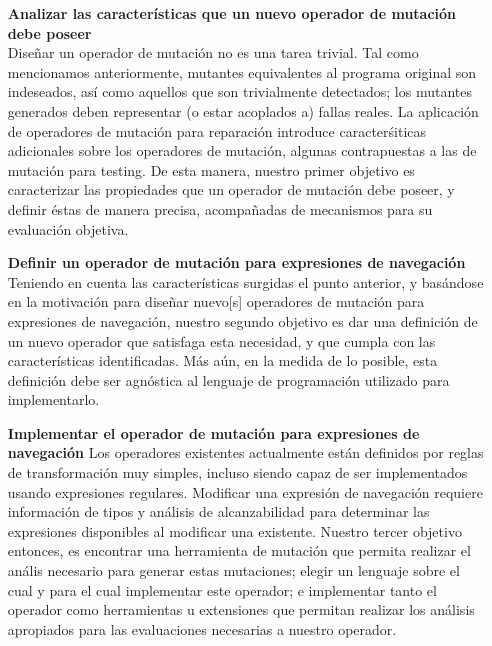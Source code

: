 \begin{enumerate}[leftmargin=.75cm,align=left,style=nextline]
	\item[\textbf{Analizar las caracter\'isticas que un nuevo operador de mutaci\'on debe poseer}]\mbox{}\\ Dise\~nar un operador de mutaci\'on no es una tarea trivial. Tal como mencionamos anteriormente, mutantes equivalentes al programa original son indeseados, as\'i como aquellos que son trivialmente detectados; los mutantes generados deben representar (o estar acoplados a) fallas reales. La aplicaci\'on de operadores de mutaci\'on para reparaci\'on introduce caracter\'siticas adicionales sobre los operadores de mutaci\'on, algunas contrapuestas a las de mutaci\'on para testing. De esta manera, nuestro primer objetivo es caracterizar las propiedades que un operador de mutaci\'on debe poseer, y definir \'estas de manera precisa, acompa\~nadas de mecanismos para su evaluaci\'on objetiva. 
	
	\item[\textbf{Definir un operador de mutaci\'on para expresiones de navegaci\'on}]\mbox{}\\
	Teniendo en cuenta las caracter\'isticas surgidas el punto anterior, y bas\'andose en la motivaci\'on para dise\~nar nuevo[s] operadores de mutaci\'on para expresiones de navegaci\'on, nuestro segundo objetivo es dar una definici\'on de un nuevo operador que satisfaga esta necesidad, y que cumpla con las caracter\'isticas identificadas. M\'as a\'un, en la medida de lo posible, esta definici\'on debe ser agn\'ostica al lenguaje de programaci\'on utilizado para implementarlo.
	
	\item[\textbf{Implementar el operador de mutaci\'on para expresiones de navegaci\'on}] Los operadores existentes actualmente est\'an definidos por reglas de transformaci\'on muy simples, incluso siendo capaz de ser implementados usando expresiones regulares. Modificar una expresi\'on de navegaci\'on requiere informaci\'on de tipos y an\'alisis de alcanzabilidad para determinar las expresiones disponibles al modificar una existente. Nuestro tercer objetivo entonces, es encontrar una herramienta de mutaci\'on que permita realizar el an\'alis necesario para generar estas mutaciones; elegir un lenguaje sobre el cual y para el cual implementar este operador; e implementar tanto el operador como herramientas u extensiones que permitan realizar los an\'alisis apropiados para las evaluaciones necesarias a nuestro operador.
	

\end{enumerate}
